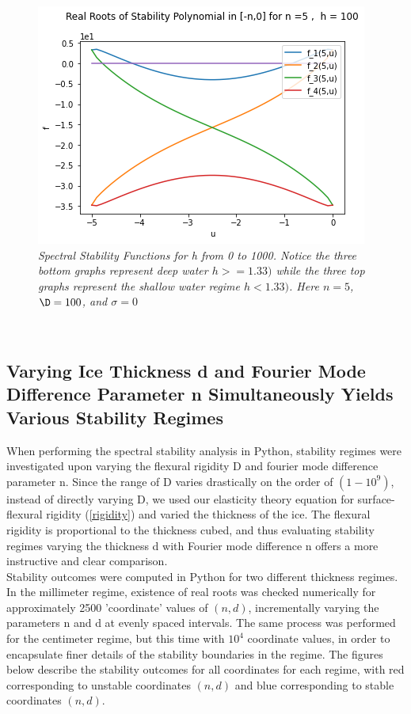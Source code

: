 \documentclass{article}
\begin{document}
\begin{figure}[hbt!]
\includegraphics[width=.3\textwidth]{h6.png}\hfill
\caption{\emph{Spectral Stability Functions for h from 0 to 1000. Notice the three bottom graphs represent deep water \(h >= 1.33)\) while the three top graphs represent the shallow water regime \(h < 1.33)\). Here \(n = 5\), \(\D = 100\), and \(\sigma = 0\)}} \label{hvary}
\end{figure}



\\

\subsection{Varying Ice Thickness d and Fourier Mode Difference Parameter  n Simultaneously Yields Various Stability Regimes}

When performing the spectral stability analysis in Python, stability regimes were investigated upon varying the flexural rigidity D and fourier mode difference parameter n. Since the range of D varies drastically on the order of \((1-10^9)\), instead of directly varying D, we used our elasticity theory equation for surface-flexural rigidity (\ref{rigidity}) and varied the thickness of the ice. The flexural rigidity is proportional to the thickness cubed, and thus evaluating stability regimes varying the thickness d with Fourier mode difference n offers a more instructive and clear comparison. \\

Stability outcomes were computed in Python for two different thickness regimes. In the millimeter regime, existence of real roots was checked numerically for approximately 2500 'coordinate' values of \((n,d)\), incrementally varying the parameters n and d at evenly spaced intervals. The same process was performed for the centimeter regime, but this time with \(10^4\) coordinate values, in order to encapsulate finer details of the stability boundaries in the regime. The figures below describe the stability outcomes for all coordinates for each regime, with red corresponding to unstable coordinates \((n,d)\) and blue corresponding to stable coordinates \((n,d)\). \\
\end{document}
